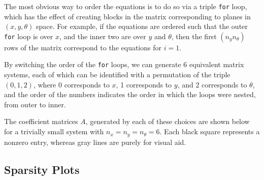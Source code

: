 \documentclass[10pt]{article}
\begin{document}
\begin{multicols}{2}
The most obvious way to order the equations is to do so via a triple \texttt{for} loop, which has the effect of creating blocks in the matrix corresponding to planes in $(x,y,\theta)$ space.
For example, if the equations are ordered such that the outer \texttt{for} loop is over $x$, and the inner two are over $y$ and $\theta$, then the first $(n_y n_\theta)$ rows of the matrix correspond to the equations for $i=1$.

By switching the order of the \texttt{for} loops, we can generate 6 equivalent matrix systems, each of which can be identified with a permutation of the triple $(0,1,2)$, where 0 corresponds to $x$, 1 corresponds to $y$, and 2 corresponds to $\theta$, and the order of the numbers indicates the order in which the loops were nested, from outer to inner.

The coefficient matrices $A$, generated by each of these choices are shown below for a trivially small system with $n_x=n_y=n_\theta=6$.
Each black square represents a nonzero entry, whereas gray lines are purely for visual aid.

\pagebreak

\subsection{Sparsity Plots}

\newcommand{\spwidth}{2.5in}
\newcommand{\spmgin}{.1in}


\end{multicols}
\end{document}
